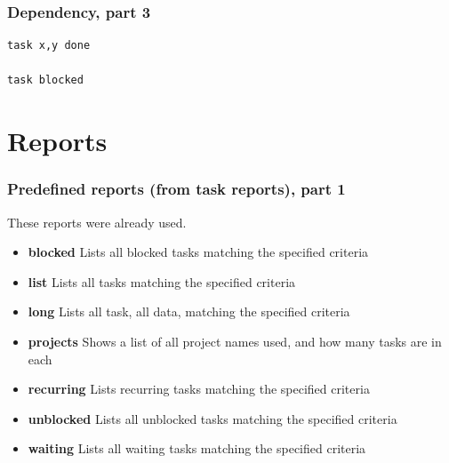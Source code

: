 \documentclass[t,handout]{beamer}
\begin{document}
\begin{frame}[fragile]\frametitle{Dependency, part 3}
    \vfill
    \begin{lstlisting}
task x,y done

task blocked\end{lstlisting}
\end{frame}

\section{Reports}

\begin{frame}[fragile]\frametitle{Predefined reports (from task reports), part 1}
    \vfill
    These reports were already used.

    \begin{itemize}
        \item \textbf{blocked}          Lists all blocked tasks matching the specified criteria
        \item \textbf{list}             Lists all tasks matching the specified criteria
        \item \textbf{long}             Lists all task, all data, matching the specified criteria
        \item \textbf{projects}         Shows a list of all project names used, and how many tasks are in each
        \item \textbf{recurring}        Lists recurring tasks matching the specified criteria
        \item \textbf{unblocked}        Lists all unblocked tasks matching the specified criteria
        \item \textbf{waiting}          Lists all waiting tasks matching the specified criteria
    \end{itemize}
\end{frame}
\end{document}
